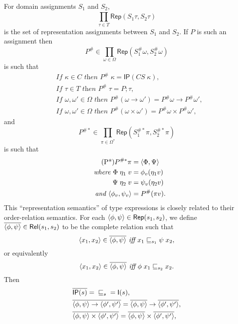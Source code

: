 \documentclass[sigplan,screen,nonacm,balance=false]{acmart}
\theoremstyle{plain}
\DeclarePairedDelimiter{\pair}{\langle}{\rangle}
\newcommand{\CS}{\mathit{CS}}
\newcommand{\Rel}{\mathsf{Rel}}
\newcommand{\Id}{\mathsf{I}}
\newcommand{\Rep}{\mathsf{Rep}}
\newcommand{\IP}{\mathsf{IP}}
\begin{document}
For domain assignments $S_1$ and $S_2$,
%
\begin{equation*}
  \prod_{\tau \in T}^{} \Rep(S_1 \tau, S_2 \tau)
\end{equation*}
%
is the set of representation assignments between $S_1$ and $S_2$.
If $P$ is such an assignment then
%
\begin{equation*}
  P^\# \in \prod_{\omega \in \Omega}^{} \Rep(S^\#_1 \omega, S^\#_2 \omega)
\end{equation*}
%
is such that
%
\begin{align*}
  \tag{P1}
  &\textit{If } \kappa \in C \textit{ then } P^\# \; \kappa = \IP(\CS \; \kappa), \\
  \tag{P2}
  &\textit{If } \tau \in T \textit{ then } P^\# \; \tau = P ; \tau,\\
  \tag{P3}
  &\textit{If } \omega, \omega' \in \Omega \textit{ then } P^\#(\omega \to \omega') = P^\# \omega \to P^\# \omega', \\
  \tag{P4}
  &\textit{If } \omega, \omega' \in \Omega \textit{ then } P^\#(\omega \times \omega') = P^\# \omega \times P^\# \omega',
\end{align*}
%
and
%
\begin{equation*}
  P^{\#*} \in \prod_{\pi \in \Omega^*} \Rep(S^{\#*}_1 \pi, S^{\#*}_2 \pi)
\end{equation*}
%
is such that
%
\begin{align*}
  \tag{P*}
  P^{\#*} \pi &= \pair{\Phi, \Psi} \\
  \textit{where } \Phi \; \eta_1 \; v &= \phi_v(\eta_1 v) \\
  \Psi \; \eta_2 \; v &= \psi_v(\eta_2 v) \\
  \textit{and } \pair{\phi_v, \psi_v} &= P^\#(\pi v).
\end{align*}
%
This ``representation semantics'' of type expressions is closely related to their order-relation semantics.
For each $\pair{\phi, \psi} \in \Rep(s_1, s_2)$, we define $\overline{\pair{\phi, \psi}} \in \Rel(s_1, s_2)$ to be the complete relation such that
%
\begin{equation*}
  \pair{x_1, x_2} \in \overline{\pair{\phi, \psi}} \textit{ iff } x_1 \sqsubseteq_{s_1} \psi \; x_2,
\end{equation*}
%
or equivalently
%
\begin{equation*}
  \pair{x_1, x_2} \in \overline{\pair{\phi, \psi}} \textit{ iff } \phi \; x_1 \sqsubseteq_{s_2} x_2.
\end{equation*}
%
Then
%
\begin{align*}
  & \overline{\IP(s)} = {} \sqsubseteq_s {} = \Id(s), \\
  & \overline{\pair{\phi, \psi} \to \pair{\phi', \psi'}} = \overline{\pair{\phi, \psi}} \to \overline{\pair{\phi', \psi'}}, \\
  & \overline{\pair{\phi, \psi} \times \pair{\phi', \psi'}} = \overline{\pair{\phi, \psi}} \times \overline{\pair{\phi', \psi'}}, \\
\end{align*}
\end{document}
